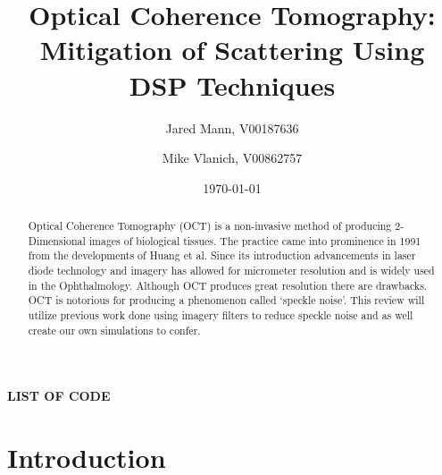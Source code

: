 \documentclass[%
reprint,
showpacs,preprintnumbers,
bibnotes,
amsmath,amssymb,
aps,
pra,
]{revtex4-1}
\begin{document}
	\renewcommand*{\lstlistlistingname}{List of Code}
	\renewcommand*\lstlistingname {Listing}

	\title{Optical Coherence Tomography: \\ Mitigation of Scattering Using DSP Techniques}

	\author{Jared Mann, V00187636}
	\author{Mike Vlanich, V00862757}

	\date{\today}%


	\begin{abstract}
		Optical Coherence Tomography (OCT) is a non-invasive method of producing 2-Dimensional images of biological tissues. The practice came into prominence in 1991 from the developments of Huang et al. Since its introduction advancements in laser diode technology and imagery has allowed for micrometer resolution and is widely used in the Ophthalmology.\cite{bhende_optical_2018} Although OCT produces great resolution there are drawbacks. OCT is notorious for producing a phenomenon called ‘speckle noise’. This review will utilize previous work done using imagery filters to reduce speckle noise and as well create our own simulations to confer.
	\end{abstract}

	\maketitle
	\tableofcontents
	\makeatletter
	\let\toc@pre\relax
	\let\toc@post\relax
	\makeatother	
  	\listoffigures
  	\listoftables
	\makeatletter
	\renewcommand\lstlistoflistings{
		\begin{center}
			\textbf{\small \MakeUppercase{\lstlistlistingname}} \\[1.5ex]
		\end{center}
		\vspace{-1em}
	}
	\makeatother
	
  	\lstlistoflistings


	\section{\label{sec:level1}		Introduction}
\end{document}
